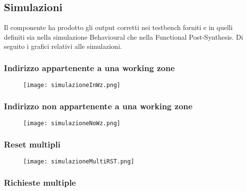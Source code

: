 \documentclass [a4paper, 12pt]{article}
\begin{document}
%
%
\subsection{Simulazioni}
Il componente ha prodotto gli output corretti nei testbench forniti e in quelli definiti sia nella simulazione Behavioural che nella Functional Post-Synthesis. Di seguito i grafici relativi alle simulazioni.
\subsubsection{Indirizzo appartenente a una working zone}


\begin{figure}[htbp]
\begin{center}
\texttt{[image: simulazioneInWz.png]}
\end{center}
\label{fig:figure4}
\end{figure}


\subsubsection{Indirizzo non appartenente a una working zone}


\begin{figure}[htbp]
\begin{center}
\texttt{[image: simulazioneNoWz.png]}
\end{center}
\label{fig:figure5}
\end{figure}


\subsubsection{Reset multipli}
\begin{figure}[H]
\begin{center}
\texttt{[image: simulazioneMultiRST.png]}
\end{center}
\label{fig:figure6}
\end{figure}


\subsubsection{Richieste multiple}
\end{document}
